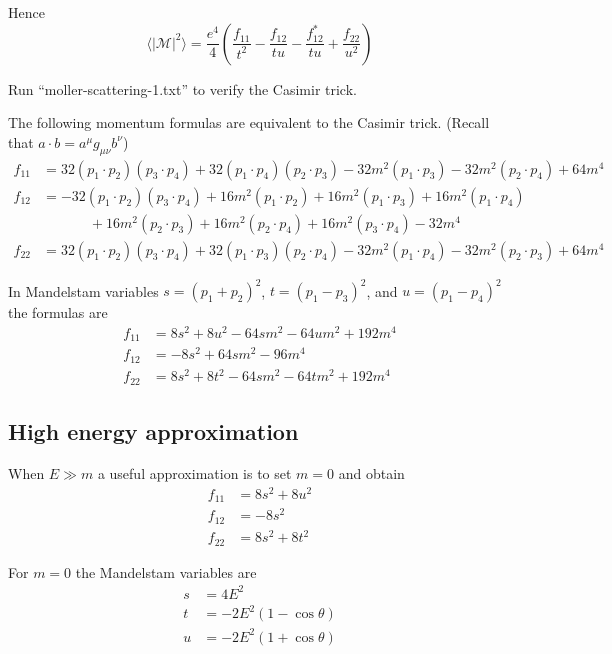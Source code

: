 \documentclass[12pt]{article}
\begin{document}
\noindent
Hence
\begin{equation*}
\langle|\mathcal{M}|^2\rangle
=\frac{e^4}{4}
\left(
\frac{f_{11}}{t^2}-\frac{f_{12}}{tu}-\frac{f_{12}^*}{tu}+\frac{f_{22}}{u^2}
\right)
\end{equation*}

\noindent
Run ``moller-scattering-1.txt'' to verify the Casimir trick.

\bigskip
\noindent
The following momentum formulas are equivalent to the Casimir trick.
(Recall that $a\cdot b=a^\mu g_{\mu\nu}b^\nu$)
\begin{align*}
f_{11}&=
32 (p_1\cdot p_2) (p_3\cdot p_4) +
32 (p_1\cdot p_4) (p_2\cdot p_3) -
32 m^2 (p_1\cdot p_3) -
32 m^2 (p_2\cdot p_4) +
64 m^4
\\
f_{12}&=
-32 (p_1\cdot p_2) (p_3\cdot p_4)
+ 16 m^2 (p_1\cdot p_2) + 16 m^2 (p_1\cdot p_3) + 16 m^2 (p_1\cdot p_4) \\
&\phantom{=}\qquad{} + 16 m^2 (p_2\cdot p_3) + 16 m^2 (p_2\cdot p_4) + 16 m^2 (p_3\cdot p_4) - 32 m^4
\\
f_{22}&=
32 (p_1\cdot p_2) (p_3\cdot p_4) +
32 (p_1\cdot p_3) (p_2\cdot p_4) -
32 m^2 (p_1\cdot p_4) -
32 m^2 (p_2\cdot p_3) +
64 m^4
\end{align*}

\noindent
In Mandelstam variables $s=(p_1+p_2)^2$, $t=(p_1-p_3)^2$, and $u=(p_1-p_4)^2$ the formulas are
\begin{align*}
f_{11} &= 8 s^2 + 8 u^2 - 64 s m^2 - 64 u m^2 + 192 m^4
\\
f_{12} &= -8 s^2 + 64 s m^2 - 96 m^4
\\
f_{22} &= 8 s^2 + 8 t^2 - 64 s m^2 - 64 t m^2 + 192 m^4
\end{align*}

\subsection*{High energy approximation}
When $E\gg m$ a useful approximation is to set $m=0$ and obtain
\begin{align*}
f_{11}&=8s^2+8u^2\\
f_{12}&=-8s^2\\
f_{22}&=8s^2+8t^2
\end{align*}

\noindent
For $m=0$ the Mandelstam variables are
\begin{align*}
s&=4E^2
\\
t&=-2E^2(1-\cos\theta)%
\\
u&=-2E^2(1+\cos\theta)%
\end{align*}
\end{document}
